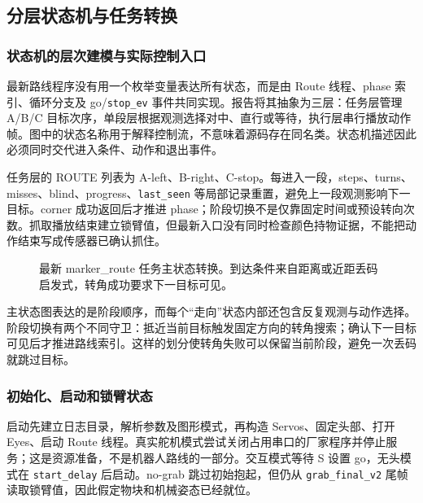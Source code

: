 \subsection{分层状态机与任务转换}
\subsubsection{状态机的层次建模与实际控制入口}
最新路线程序没有用一个枚举变量表达所有状态，而是由 Route 线程、phase 索引、循环分支及 go/\texttt{stop\_\allowbreak ev} 事件共同实现。报告将其抽象为三层：任务层管理 A/B/C 目标次序，单段层根据观测选择对中、直行或等待，执行层串行播放动作帧。图中的状态名称用于解释控制流，不意味着源码存在同名类。状态机描述因此必须同时交代进入条件、动作和退出事件。

任务层的 ROUTE 列表为 A-left、B-right、C-stop。每进入一段，steps、turns、misses、blind、progress、\texttt{last\_\allowbreak seen} 等局部记录重置，避免上一段观测影响下一目标。corner 成功返回后才推进 phase；阶段切换不是仅靠固定时间或预设转向次数。抓取播放结束建立锁臂值，但最新入口没有同时检查颜色持物证据，不能把动作结束写成传感器已确认抓住。
\begin{figure}[H]\centering\caption{最新 marker\_route 任务主状态转换。到达条件来自距离或近距丢码启发式，转角成功要求下一目标可见。}\label{fig:hum-main-fsm}\end{figure}

主状态图表达的是阶段顺序，而每个“走向”状态内部还包含反复观测与动作选择。阶段切换有两个不同守卫：抵近当前目标触发固定方向的转角搜索；确认下一目标可见后才推进路线索引。这样的划分使转角失败可以保留当前阶段，避免一次丢码就跳过目标。


\subsubsection{初始化、启动和锁臂状态}
启动先建立日志目录，解析参数及图形模式，再构造 Servos、固定头部、打开 Eyes、启动 Route 线程。真实舵机模式尝试关闭占用串口的厂家程序并停止服务；这是资源准备，不是机器人路线的一部分。交互模式等待 S 设置 go，无头模式在 \texttt{start\_\allowbreak delay} 后启动。no-grab 跳过初始抱起，但仍从 \texttt{grab\_\allowbreak final\_\allowbreak v2} 尾帧读取锁臂值，因此假定物块和机械姿态已经就位。

